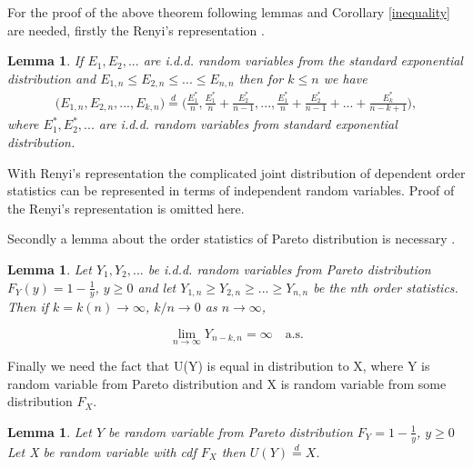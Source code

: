 \documentclass[english,12pt,a4paper,pdftex,sci,utf8]{aaltothesis} %
\newtheorem{lemma}[theorem]{Lemma}
\begin{document}
For the proof of the above theorem following lemmas and Corollary \ref{inequality} are needed, firstly the Renyi's representation \cite{renyi}.
\begin{lemma}
If $E_1, E_2,...$ are i.d.d. random variables from the standard exponential distribution and $E_{1,n} \leq E_{2,n} \leq ... \leq E_{n,n}$ then for $k \leq n$ we have
\begin{multline*}
\big(E_{1,n}, E_{2,n}, ... , E_{k,n}\big) 
\overset{d}{=} \Big(\frac{E_1^*}{n}, \frac{E_1^*}{n}+\frac{E_2^*}{n-1}, ... , \frac{E_1^*}{n}+\frac{E_2^*}{n-1}+...+ \frac{E_k^*}{n-k+1}\Big),
\end{multline*}
where $E_1^*,E_2^*,...$ are i.d.d. random variables from standard exponential distribution.
\label{renrep}
\end{lemma}

With Renyi's representation the complicated joint distribution of dependent order statistics can be represented in terms of independent random variables. Proof of the Renyi's representation is omitted here.

Secondly a lemma about the order statistics of Pareto distribution is necessary \cite{deHaan}.

\begin{lemma}
Let $Y_1, Y_2, ...$ be i.d.d. random variables from Pareto distribution $F_Y(y)=1-\frac{1}{y}$, $y \geq 0$ and let $Y_{1,n} \geq Y_{2,n} \geq ... \geq Y_{n,n}$ be the nth order statistics. Then if $k=k(n)  \rightarrow \infty$, $k/n \rightarrow 0$ as $n \rightarrow \infty$,

\begin{equation*}
\lim_{n\to\infty} Y_{n-k,n} = \infty  \quad  \text{a.s}.
\end{equation*}
\label{asconv}
\end{lemma}


Finally we need the fact that U(Y) is equal in distribution to X, where Y is random variable from Pareto distribution and X is random variable from some distribution $F_X$.

\begin{lemma}
Let $Y$ be random variable from Pareto distribution $F_Y=1-\frac{1}{y}$, $y \geq 0$ Let X be random variable with cdf $F_X$ then $U(Y) \overset{d}{=} X$.
\label{U}
\end{lemma}
\end{document}
